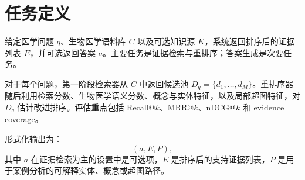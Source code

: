\section{任务定义}

给定医学问题 $q$、生物医学语料库 $C$ 以及可选知识源 $K$，系统返回排序后的证据列表 $E$，并可选返回答案 $a$。主要任务是证据检索与重排序；答案生成是次要任务。

对于每个问题，第一阶段检索器从 $C$ 中返回候选池 $D_q = \{d_1,\ldots,d_M\}$。重排序器随后利用检索分数、生物医学语义分数、概念与实体特征，以及局部超图特征，对 $D_q$ 估计改进排序。评估重点包括 Recall@$k$、MRR@$k$、nDCG@$k$ 和 evidence coverage。

形式化输出为：
\[
  (a, E, P),
\]
其中 $a$ 在证据检索为主的设置中是可选项，$E$ 是排序后的支持证据列表，$P$ 是用于案例分析的可解释实体、概念或超图路径。
